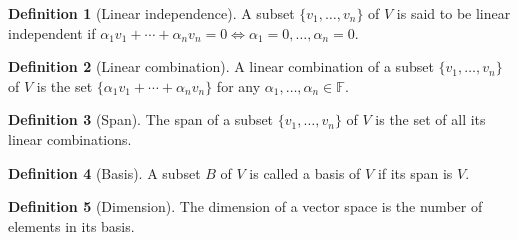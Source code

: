 \documentclass{article}
\theoremstyle{plain}
\numberwithin{thm}{section}
\theoremstyle{plain}
\numberwithin{prop}{section}
\theoremstyle{definition}
\newtheorem{defn}{Definition}
\numberwithin{defn}{section}
\theoremstyle{remark}
\numberwithin{equation}{section}
\begin{document}
\begin{defn}[Linear independence]\label{s1d2}
A subset $\{v_1, \ldots, v_n\}$ of $V$ is said to be linear independent if 
$\alpha_1 v_1 + \cdots + \alpha_n v_n = 0 \Leftrightarrow \alpha_1 = 0, \ldots,
\alpha_n = 0$.
\end{defn}

\begin{defn}[Linear combination]\label{s1d3}
A linear combination of a subset $\{v_1, \ldots, v_n\}$ of $V$ is the set $\{
\alpha_1 v_1 + \cdots + \alpha_n v_n\}$ for any $\alpha_1, \ldots, \alpha_n \in
\mathbb{F}$.
\end{defn}

\begin{defn}[Span]\label{s1d4}
The span of a subset $\{v_1, \ldots, v_n\}$ of $V$ is the set of all its linear
combinations.
\end{defn}

\begin{defn}[Basis]\label{s1d5}
A subset $B$ of $V$ is called a basis of $V$ if its span is $V$.
\end{defn}

\begin{defn}[Dimension]\label{s1d6}
The dimension of a vector space is the number of elements in its basis.
\end{defn}
\end{document}
